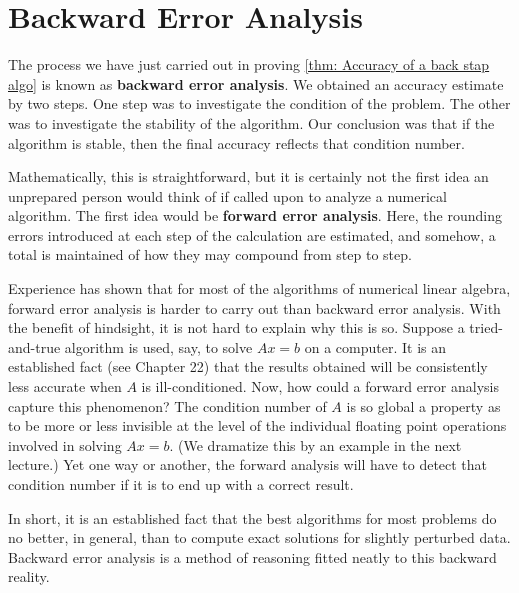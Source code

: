 \section{Backward Error Analysis} 
The process we have just carried out in proving \autoref{thm: Accuracy of a back stap algo} is known as \textbf{backward error analysis}. We obtained an accuracy estimate by two steps. One step was to investigate the condition of the problem. The other was to investigate the stability of the algorithm. Our conclusion was that if the algorithm is stable, then the final accuracy reflects that condition number.


Mathematically, this is straightforward, but it is certainly not the first idea an unprepared person would think of if called upon to analyze a numerical algorithm. The first idea would be \textbf{forward error analysis}. Here, the rounding errors introduced at each step of the calculation are estimated, and somehow, a total is maintained of how they may compound from step to step.

Experience has shown that for most of the algorithms of numerical linear algebra, forward error analysis is harder to carry out than backward error analysis. With the benefit of hindsight, it is not hard to explain why this is so. Suppose a tried-and-true algorithm is used, say, to solve $A x=b$ on a computer. It is an established fact (see Chapter 22) that the results obtained will be consistently less accurate when $A$ is ill-conditioned. Now, how could a forward error analysis capture this phenomenon? The condition number of $A$ is so global a property as to be more or less invisible at the level of the individual floating point operations involved in solving $A x=b$. (We dramatize this by an example in the next lecture.) Yet one way or another, the forward analysis will have to detect that condition number if it is to end up with a correct result.

In short, it is an established fact that the best algorithms for most problems do no better, in general, than to compute exact solutions for slightly perturbed data. Backward error analysis is a method of reasoning fitted neatly to this backward reality.